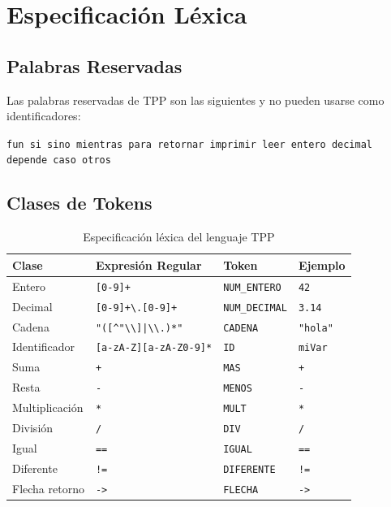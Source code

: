 \section{Especificación Léxica}

\subsection{Palabras Reservadas}

Las palabras reservadas de TPP son las siguientes y no pueden usarse como identificadores:

\begin{center}
\texttt{fun \quad si \quad sino \quad mientras \quad para \quad retornar \quad imprimir \quad leer \quad entero \quad decimal \quad depende \quad caso \quad otros}
\end{center}

\subsection{Clases de Tokens}

\begin{table}[H]
\centering
\begin{tabular}{llll}
\toprule
\textbf{Clase} & \textbf{Expresión Regular} & \textbf{Token} & \textbf{Ejemplo} \\
\midrule
Entero & \texttt{[0-9]+} & \texttt{NUM\_ENTERO} & \texttt{42} \\
Decimal & \texttt{[0-9]+\textbackslash.[0-9]+} & \texttt{NUM\_DECIMAL} & \texttt{3.14} \\
Cadena & \texttt{"([\textasciicircum "\textbackslash\textbackslash]|\textbackslash\textbackslash.)*"} & \texttt{CADENA} & \texttt{"hola"} \\
Identificador & \texttt{[a-zA-Z][a-zA-Z0-9]*} & \texttt{ID} & \texttt{miVar} \\
Suma & \texttt{+} & \texttt{MAS} & \texttt{+} \\
Resta & \texttt{-} & \texttt{MENOS} & \texttt{-} \\
Multiplicación & \texttt{*} & \texttt{MULT} & \texttt{*} \\
División & \texttt{/} & \texttt{DIV} & \texttt{/} \\
Igual & \texttt{==} & \texttt{IGUAL} & \texttt{==} \\
Diferente & \texttt{!=} & \texttt{DIFERENTE} & \texttt{!=} \\
Flecha retorno & \texttt{->} & \texttt{FLECHA} & \texttt{->} \\
\bottomrule
\end{tabular}
\caption{Especificación léxica del lenguaje TPP}
\label{tab:especif-lexica}
\end{table}

